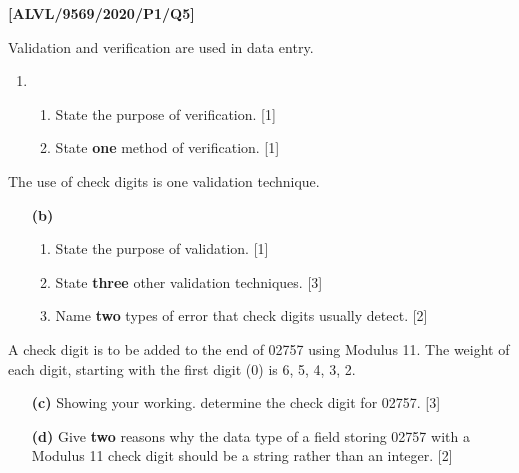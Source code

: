 \item \textbf{{[}ALVL/9569/2020/P1/Q5{]} }

Validation and verification are used in data entry.
\begin{enumerate}
\item {}
\begin{enumerate}
\item State the purpose of verification. \hfill{} {[}1{]}
\item State \textbf{one} method of verification. \hfill{} {[}1{]}
\end{enumerate}
\end{enumerate}
The use of check digits is one validation technique.
\begin{enumerate}
\item[\textbf{(b)}] {}
\begin{enumerate}
\item State the purpose of validation. \hfill{}{[}1{]}
\item State \textbf{three} other validation techniques. \hfill{}{[}3{]}
\item Name \textbf{two} types of error that check digits usually detect.
\hfill{}{[}2{]}
\end{enumerate}
\end{enumerate}
A check digit is to be added to the end of 02757 using Modulus 11.
The weight of each digit, starting with the first digit (0) is 6,
5, 4, 3, 2.
\begin{enumerate}
\item[\textbf{(c)}] Showing your working. determine the check digit for 02757. \hfill{}{[}3{]}
\item[\textbf{(d)}] Give \textbf{two} reasons why the data type of a field storing 02757
with a Modulus 11 check digit should be a string rather than an integer.
\hfill{} {[}2{]}
\end{enumerate}